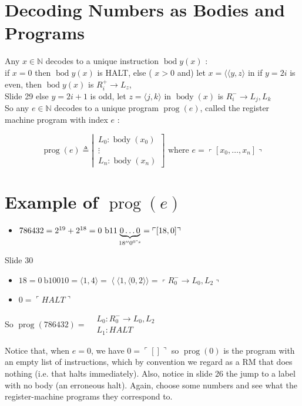 \documentclass[10pt]{article}
\begin{document}
\section*{Decoding Numbers as Bodies and Programs}
Any $x \in \mathbb{N}$ decodes to a unique instruction $\operatorname{bod} y(x)$ :\\
if $x=0$ then $\operatorname{bod} y(x)$ is HALT, else ( $x>0$ and) let $x=\langle\langle y, z\rangle$ in if $y=2 i$ is even, then $\operatorname{bod} y(x)$ is $R_{i}^{+} \rightarrow L_{z}$,\\
Slide 29 else $y=2 i+1$ is odd, let $z=\langle j, k\rangle$ in $\operatorname{body}(x)$ is $R_{i}^{-} \rightarrow L_{j}, L_{k}$\\
So any $e \in \mathbb{N}$ decodes to a unique program $\operatorname{prog}(e)$, called the register machine program with index $e$ :

$$
\left.\operatorname{prog}(e) \triangleq \left\lvert\, \begin{array}{c}
L_{0}: \operatorname{body}\left(x_{0}\right) \\
\vdots \\
L_{n}: \operatorname{body}\left(x_{n}\right)
\end{array}\right.\right] \text { where } e=\left\ulcorner\left[x_{0}, \ldots, x_{n}\right]\right\urcorner
$$

\section*{Example of $\operatorname{prog}(e)$}
\begin{itemize}
  \item $786432=2^{19}+2^{18}=0 \mathrm{~b} 11 \underbrace{0 \ldots 0}_{18{ }^{\prime \prime} 0^{0 " s}}=\ulcorner[18,0]\urcorner$
\end{itemize}

Slide 30

\begin{itemize}
  \item $18=0 \mathrm{~b} 10010=\langle 1,4\rangle=\left\langle\langle 1,\langle 0,2\rangle\rangle=\left\ulcorner R_{0}^{-} \rightarrow L_{0}, L_{2}\right\urcorner\right.$
  \item $0=\ulcorner H A L T\urcorner$
\end{itemize}

So $\operatorname{prog}(786432)=\begin{aligned} & L_{0}: R_{0}^{-} \rightarrow L_{0}, L_{2} \\ & L_{1}: H A L T\end{aligned}$

Notice that, when $e=0$, we have $0=\ulcorner[]\urcorner$ so $\operatorname{prog}(0)$ is the program with an empty list of instructions, which by convention we regard as a RM that does nothing (i.e. that halts immediately). Also, notice in slide 26 the jump to a label with no body (an erroneous halt). Again, choose some numbers and see what the register-machine programs they correspond to.
\end{document}
